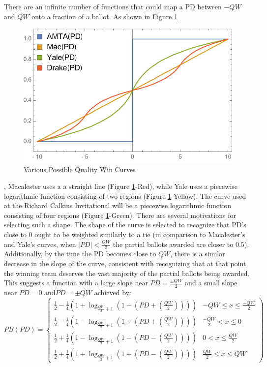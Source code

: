 \documentclass{article}
\begin{document}
There are an infinite number of functions that could map a PD between $-QW$ and $QW$ onto a fraction of a ballot.  As shown in Figure \ref{ballotCurves}
\begin{figure}[h]
\centering
\caption{Various Possible Quality Win Curves}
\label{ballotCurves}
\includegraphics[width=1.0\linewidth]{BallotCurve.pdf}
\end{figure}
, Macalester uses a a straight line (Figure \ref{ballotCurves}-Red), while Yale uses a piecewise logarithmic function consisting of two regions (Figure \ref{ballotCurves}-Yellow).  The curve used at the Richard Calkins Invitational will be a piecewise logarithmic function consisting of four regions (Figure \ref{ballotCurves}-Green).  There are several motivations for selecting such a shape.  The shape of the curve is selected to recognize that PD's close to 0 ought to be weighted similarly to a tie (in comparison to Macalester's and Yale's curves, when $|PD|<\frac{QW}{2}$ the partial ballots awarded are closer to $0.5$).  Additionally, by the time the PD becomes close to $QW$, there is a similar decrease in the slope of the curve, consistent with recognizing that at that point, the winning team deserves the vast majority of the partial ballots being awarded.  This suggests a function with a large slope near $PD=\frac{\pm QW}{2}$ and a small slope near $PD=0$ and$PD=\pm QW$ achieved by:\\
\begin{displaymath}
   PB(PD) = \left\{
     \begin{array}{lr}
       \frac{1}{2}-\frac{1}{4}\left(1+\log_{\frac{QW}{2}+1}\left(1-\left(PD+\left(\frac{QW}{2}\right)\right)\right)\right) &  -QW\le x\le \frac{-QW}{2}\\
       \frac{1}{2}-\frac{1}{4}\left(1-\log_{\frac{QW}{2}+1}\left(1+\left(PD+\left(\frac{QW}{2}\right)\right)\right)\right) &  \frac{-QW}{2}<x\le 0\\
       \frac{1}{2}+\frac{1}{4}\left(1-\log_{\frac{QW}{2}+1}\left(1-\left(PD-\left(\frac{QW}{2}\right)\right)\right)\right) &  0<x\le\frac{QW}{2}\\
       \frac{1}{2}+\frac{1}{4}\left(1+\log_{\frac{QW}{2}+1}\left(1+\left(PD-\left(\frac{QW}{2}\right)\right)\right)\right) & \frac{QW}{2}\le x \le QW
     \end{array}
  \right)
\end{displaymath}
\end{document}
